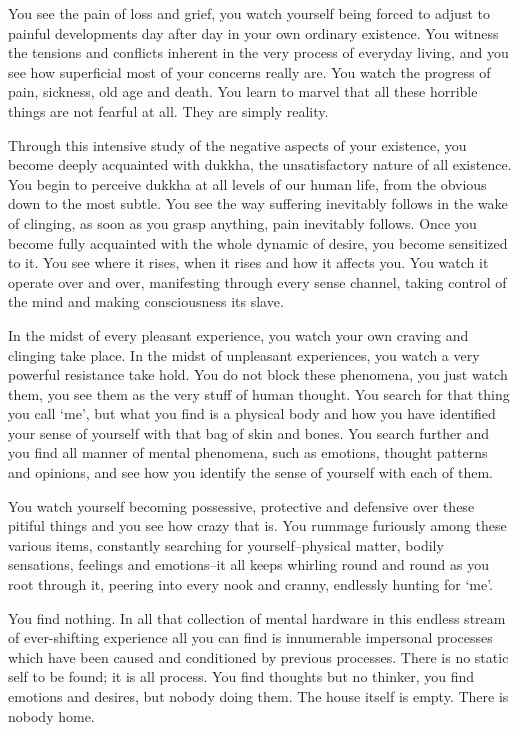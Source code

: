 You see the pain of loss and grief, you watch yourself being forced to adjust to
painful developments day after day in your own ordinary existence. You witness
the tensions and conflicts inherent in the very process of everyday living, and
you see how superficial most of your concerns really are. You watch the progress
of pain, sickness, old age and death. You learn to marvel that all these
horrible things are not fearful at all. They are simply reality.

Through this intensive study of the negative aspects of your existence, you
become deeply acquainted with dukkha, the unsatisfactory nature of all
existence. You begin to perceive dukkha at all levels of our human life, from
the obvious down to the most subtle. You see the way suffering inevitably
follows in the wake of clinging, as soon as you grasp anything, pain inevitably
follows. Once you become fully acquainted with the whole dynamic of desire, you
become sensitized to it. You see where it rises, when it rises and how it
affects you. You watch it operate over and over, manifesting through every sense
channel, taking control of the mind and making consciousness its slave.

In the midst of every pleasant experience, you watch your own craving and
clinging take place. In the midst of unpleasant experiences, you watch a very
powerful resistance take hold. You do not block these phenomena, you just watch
them, you see them as the very stuff of human thought. You search for that thing
you call `me', but what you find is a physical body and how you have identified
your sense of yourself with that bag of skin and bones. You search further and
you find all manner of mental phenomena, such as emotions, thought patterns and
opinions, and see how you identify the sense of yourself with each of them.

You watch yourself becoming possessive, protective and defensive over these
pitiful things and you see how crazy that is. You rummage furiously among these
various items, constantly searching for yourself--physical matter, bodily
sensations, feelings and emotions--it all keeps whirling round and round as you
root through it, peering into every nook and cranny, endlessly hunting for `me'.

You find nothing. In all that collection of mental hardware in this endless
stream of ever-shifting experience all you can find is innumerable impersonal
processes which have been caused and conditioned by previous processes. There is
no static self to be found; it is all process. You find thoughts but no thinker,
you find emotions and desires, but nobody doing them. The house itself is empty.
There is nobody home.

